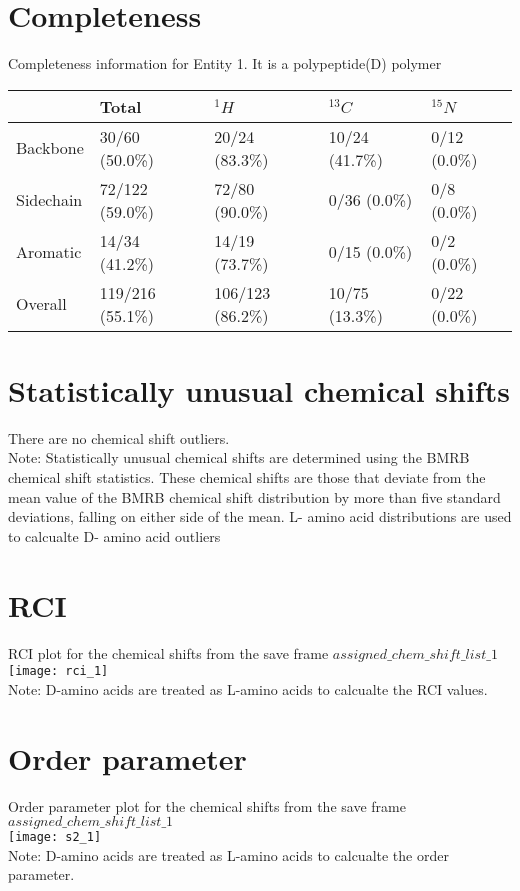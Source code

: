 \section{Completeness}
Completeness information for Entity 1. It is a polypeptide(D) polymer\\
\begin{longtable}{|l|l|l|l|l|}
\hline
  & Total & $^{1}H$ & $^{13}C$ & $^{15}N$\\\hline
Backbone & 30/60 (50.0\%)& 20/24 (83.3\%)& 10/24 (41.7\%)& 0/12 (0.0\%) \\
\hline
Sidechain & 72/122 (59.0\%)& 72/80 (90.0\%)& 0/36 (0.0\%)& 0/8 (0.0\%) \\
\hline
Aromatic & 14/34 (41.2\%)& 14/19 (73.7\%)& 0/15 (0.0\%)& 0/2 (0.0\%) \\
\hline
Overall & 119/216 (55.1\%)& 106/123 (86.2\%)& 10/75 (13.3\%)& 0/22 (0.0\%) \\
\hline
\end{longtable}

\section{Statistically unusual chemical shifts}
There are no chemical shift outliers.\ \\
Note: Statistically unusual chemical shifts are determined using the BMRB chemical shift statistics. These chemical shifts are those that deviate from the mean value of the BMRB chemical shift distribution by more than five standard deviations, falling on either side of the mean.
L- amino acid distributions are used to calcualte D- amino acid outliers
\section{RCI}
RCI plot for the chemical shifts from the  save frame $assigned\_chem\_shift\_list\_1$\\ \texttt{[image: rci\_1]}\\

Note: D-amino acids are treated as L-amino acids to calcualte the RCI values.
\section{Order parameter}
Order parameter plot for the chemical shifts from the  save frame $assigned\_chem\_shift\_list\_1$\\ \texttt{[image: s2\_1]}\\

Note: D-amino acids are treated as L-amino acids to calcualte the order parameter.
